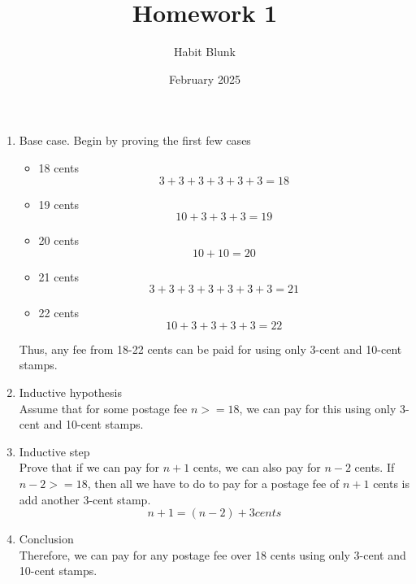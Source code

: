 \documentclass{article}
\title{Homework 1}
\author {Habit Blunk}
\date{February 2025}
\begin{document}
\maketitle
\begin{enumerate}
  \item Base case. Begin by proving the first few cases
    \begin{itemize}
      \item 18 cents
        \begin{displaymath}
          3 + 3 + 3 + 3 + 3 + 3 = 18
        \end{displaymath}
      \item 19 cents
        \begin{displaymath}
          10 + 3 + 3 + 3 = 19
        \end{displaymath}
      \item 20 cents
        \begin{displaymath}
          10 + 10 = 20
        \end{displaymath}
      \item 21 cents
        \begin{displaymath}
          3 + 3 + 3 + 3 + 3 + 3 + 3 = 21
        \end{displaymath}
      \item 22 cents
        \begin{displaymath}
          10 + 3 + 3 + 3 + 3 = 22
        \end{displaymath}
    \end{itemize}
    Thus, any fee from 18-22 cents can be paid for using only 3-cent and 10-cent stamps.
  \item Inductive hypothesis\\
    Assume that for some postage fee $ n >= 18 $, we can pay for this using only 3-cent and 10-cent stamps.
  \item Inductive step\\
    Prove that if we can pay for $ n + 1 $ cents, we can also pay for $ n - 2 $ cents.
    If $ n - 2  >= 18 $, then all we have to do to pay for a postage fee of $ n + 1 $ cents is add another 3-cent stamp.
    \begin{displaymath}
      n + 1 = (n - 2) + 3 cents
    \end{displaymath}
  \item Conclusion\\
    Therefore, we can pay for any postage fee over 18 cents using only 3-cent and 10-cent stamps.
\end{enumerate}
\end{document}
